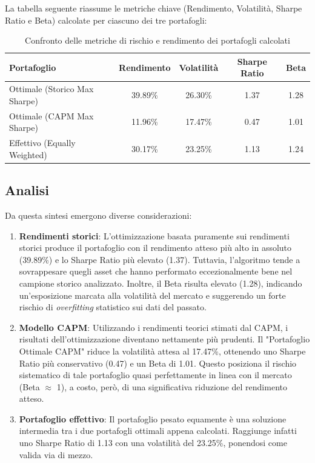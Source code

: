 \documentclass[11pt, a4paper]{report} %
\begin{document}
La tabella seguente riassume le metriche chiave (Rendimento, Volatilità, Sharpe Ratio e Beta) calcolate per ciascuno dei tre portafogli:

\begin{table}[h!]
\centering
\begin{tabular}{lcccc}
\hline
\textbf{Portafoglio} & \textbf{Rendimento} & \textbf{Volatilità} & \textbf{Sharpe Ratio} & \textbf{Beta} \\
\hline
Ottimale (Storico Max Sharpe) & 39.89\% & 26.30\% & 1.37 & 1.28 \\
Ottimale (CAPM Max Sharpe) & 11.96\% & 17.47\% & 0.47 & 1.01 \\
Effettivo (Equally Weighted) & 30.17\% & 23.25\% & 1.13 & 1.24 \\
\hline
\end{tabular}
\caption{Confronto delle metriche di rischio e rendimento dei portafogli calcolati}
\end{table}

\subsection{Analisi}
Da questa sintesi emergono diverse considerazioni:
\begin{enumerate}
    \item \textbf{Rendimenti storici}: L'ottimizzazione basata puramente sui rendimenti storici produce il portafoglio con il rendimento atteso più alto in assoluto (39.89\%) e lo Sharpe Ratio più elevato (1.37). Tuttavia, l'algoritmo tende a sovrappesare quegli asset che hanno performato eccezionalmente bene nel campione storico analizzato. Inoltre, il Beta risulta elevato (1.28), indicando un'esposizione marcata alla volatilità del mercato e suggerendo un forte rischio di \textit{overfitting} statistico sui dati del passato.
    
    \item \textbf{Modello CAPM}: Utilizzando i rendimenti teorici stimati dal CAPM, i risultati dell'ottimizzazione diventano nettamente più prudenti. Il "Portafoglio Ottimale CAPM" riduce la volatilità attesa al 17.47\%, ottenendo uno Sharpe Ratio più conservativo (0.47) e un Beta di 1.01. Questo posiziona il rischio sistematico di tale portafoglio quasi perfettamente in linea con il mercato (Beta $\approx$ 1), a costo, però, di una significativa riduzione del rendimento atteso.
    
    \item \textbf{Portafoglio effettivo}: Il portafoglio pesato equamente è una soluzione intermedia tra i due portafogli ottimali appena calcolati. Raggiunge infatti uno Sharpe Ratio di 1.13 con una volatilità del 23.25\%, ponendosi come valida via di mezzo. 
\end{enumerate}
\end{document}
